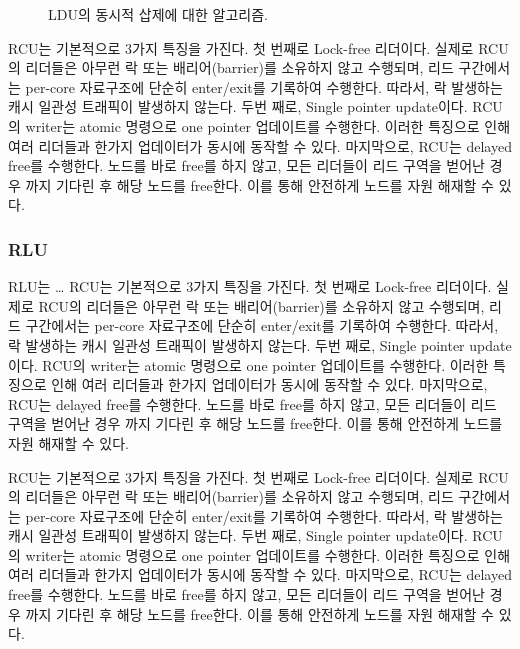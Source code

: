 \begin{figure}[h!]
\begin{center}
\inputminted[linenos,fontsize=\footnotesize,
tabsize=4]{c}{src/rcu_list_delete.c}
\end{center}
\caption{LDU의 동시적 삽제에 대한 알고리즘.}
\label{fig:gldulogicalupdate}
\end{figure}


RCU는 기본적으로 3가지 특징을 가진다. 첫 번째로 Lock-free 리더이다.
실제로 RCU의 리더들은 아무런 락 또는 배리어(barrier)를 소유하지 않고 수행되며, 리드 구간에서는
 per-core 자료구조에 단순히 enter/exit를 기록하여 수행한다. 
따라서, 락 발생하는 캐시 일관성 트래픽이 발생하지 않는다.
두번 째로, Single pointer update이다.
RCU의 writer는 atomic 명령으로 one pointer 업데이트를 수행한다.
이러한 특징으로 인해 여러 리더들과 한가지 업데이터가 동시에 동작할 수 있다.  
마지막으로, RCU는 delayed free를 수행한다.
노드를 바로 free를 하지 않고, 모든 리더들이 리드 구역을 벋어난 경우 까지 
기다린 후 해당 노드를 free한다.
이를 통해 안전하게 노드를 자원 해재할 수 있다. 



\subsubsection{RLU}

RLU는 \ldots
RCU는 기본적으로 3가지 특징을 가진다. 첫 번째로 Lock-free 리더이다.
실제로 RCU의 리더들은 아무런 락 또는 배리어(barrier)를 소유하지 않고 수행되며, 리드 구간에서는
 per-core 자료구조에 단순히 enter/exit를 기록하여 수행한다. 
따라서, 락 발생하는 캐시 일관성 트래픽이 발생하지 않는다.
두번 째로, Single pointer update이다.
RCU의 writer는 atomic 명령으로 one pointer 업데이트를 수행한다.
이러한 특징으로 인해 여러 리더들과 한가지 업데이터가 동시에 동작할 수 있다.  
마지막으로, RCU는 delayed free를 수행한다.
노드를 바로 free를 하지 않고, 모든 리더들이 리드 구역을 벋어난 경우 까지 
기다린 후 해당 노드를 free한다.
이를 통해 안전하게 노드를 자원 해재할 수 있다. 


RCU는 기본적으로 3가지 특징을 가진다. 첫 번째로 Lock-free 리더이다.
실제로 RCU의 리더들은 아무런 락 또는 배리어(barrier)를 소유하지 않고 수행되며, 리드 구간에서는
 per-core 자료구조에 단순히 enter/exit를 기록하여 수행한다. 
따라서, 락 발생하는 캐시 일관성 트래픽이 발생하지 않는다.
두번 째로, Single pointer update이다.
RCU의 writer는 atomic 명령으로 one pointer 업데이트를 수행한다.
이러한 특징으로 인해 여러 리더들과 한가지 업데이터가 동시에 동작할 수 있다.  
마지막으로, RCU는 delayed free를 수행한다.
노드를 바로 free를 하지 않고, 모든 리더들이 리드 구역을 벋어난 경우 까지 
기다린 후 해당 노드를 free한다.
이를 통해 안전하게 노드를 자원 해재할 수 있다. 


